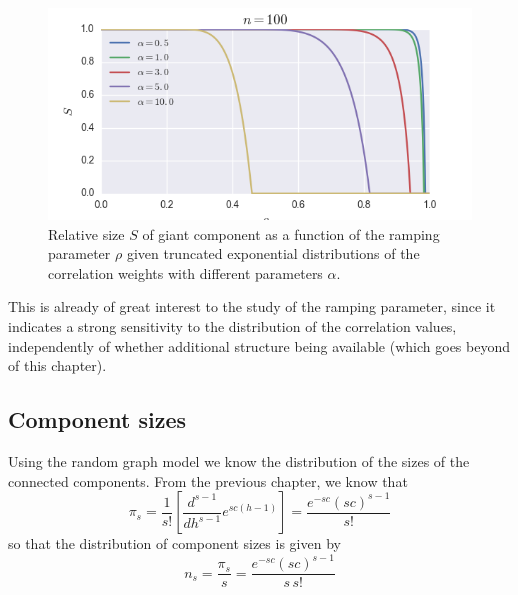 \begin{figure}[tb]
	\centering
	\includegraphics[scale=.8]{figures/3_exponential_giant_component.png}
	\caption{Relative size $S$ of giant component as a function of the ramping parameter $\rho$ given truncated exponential distributions  of the correlation weights with different parameters $\alpha$.}
	\label{fig:exponential_giant_component}
\end{figure}
This is already of great interest to the study of the ramping parameter, since it indicates a strong sensitivity to the distribution of the correlation values, independently of whether additional structure being available (which goes beyond of this chapter).





\subsection{Component sizes} %
\label{sub:component_sizes}

Using the random graph model we know the distribution of the sizes of the connected components.
From the previous chapter, we know that
\begin{equation}
	\pi_s = \frac{1}{s!}\left[  \frac{d^{s-1}}{dh^{s-1}}e^{s c(h-1)}  \right] = \frac{e^{-s c} (s c)^{s-1}}{s!}
\end{equation}
so that the distribution of component sizes is given by
\begin{equation}
	n_s = \frac{\pi_s}{s} = \frac{e^{-s c} (s c)^{s-1}}{s\,s!}
\end{equation}













